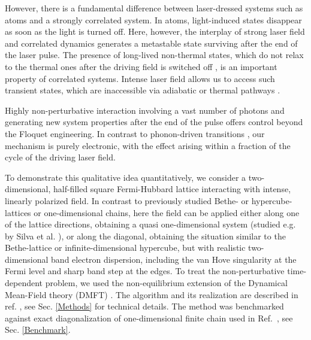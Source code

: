 \documentclass[prb,aps,twocolumn,showpacs,amsmath,amssymb]{revtex4}%
\begin{document}
However, there is a fundamental difference between 
laser-dressed systems such as atoms and a 
strongly correlated system.
In atoms, light-induced states disappear as soon as the 
light is turned off. Here, however, the interplay of strong  
laser field and correlated dynamics generates
a metastable state surviving after the end of the laser pulse.
The presence of long-lived non-thermal states, which 
do not relax to the thermal ones after the driving field is switched off \cite {N_Tsuji_PRL_2013,Joura}, is an important property 
of correlated systems. Intense laser field allows us 
to access such transient states, which are 
inaccessible via adiabatic or thermal pathways \cite{RMP14}. 

Highly non-perturbative interaction involving a vast number of photons and generating new system properties after the 
end of the pulse offers control beyond the Floquet engineering.  
In contrast to phonon-driven transitions \cite{Cavalleri}, 
our mechanism is purely electronic, with the effect arising
within a fraction of the cycle of the driving laser field.


To demonstrate this qualitative idea quantitatively, 
we consider a two-dimensional, half-filled square 
Fermi-Hubbard lattice interacting with intense,
linearly polarized field. In contrast to previously studied 
Bethe- or hypercube-lattices \cite{Naoto,Joura} or one-dimensional chains\cite{Rui}, here the field can be applied either along one of the lattice directions, obtaining a quasi one-dimensional system (studied e.g. by Silva et al. \cite{Rui}), or  along the diagonal, obtaining the situation similar to the Bethe-lattice or infinite-dimensional hypercube, but with realistic two-dimensional band electron dispersion, including the van Hove singularity at the Fermi level and sharp band step at the edges. To treat the non-perturbative 
time-dependent problem, we used the non-equilibrium 
extension \cite{Schmidt2002,RMP14} of 
the Dynamical Mean-Field theory (DMFT) \cite{DMFT}.
The algorithm and its realization are described in ref. \cite{Eckstein10}, see Sec. \ref{Methods} for technical details. The method was benchmarked 
against exact diagonalization of one-dimensional finite 
chain used in Ref.~\cite{Rui}, see Sec. \ref{Benchmark}.
\end{document}
